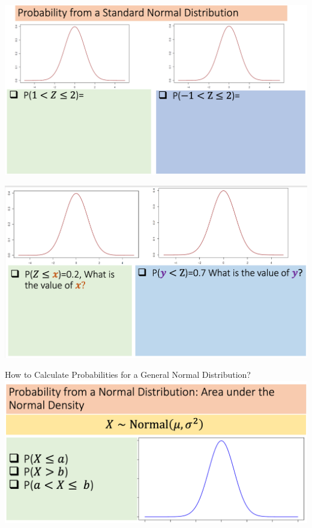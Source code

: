 \documentclass[compress]{beamer}
\begin{document}
\begin{frame}
\includegraphics[scale=.38]{figs/Phi_Function2}
\end{frame}



\begin{frame}
\includegraphics[scale=.38]{figs/Phi_Function3}
\end{frame}







\begin{frame}{How to Calculate Probabilities for a General  Normal Distribution?}
\includegraphics[scale=.35]{figs/Normal_1.png}
\vspace{1in}
\end{frame} 
\end{document}
